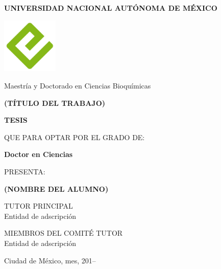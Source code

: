 \documentclass[
  12pt,
  letterpaper,
  DIV=11,
  numbers=noendperiod,
  oneside]{scrreport}
\begin{document}
\begin{titlepage}
    \begin{center}
        \vspace*{0.5cm}
        
        \Large
        \textbf{UNIVERSIDAD NACIONAL AUTÓNOMA DE MÉXICO}
        
        \includegraphics[width=0.2\textwidth]{cover.png}
        
        \vspace{0.5cm}
        
        \vspace{0.5cm}
        \Large
        Maestría y Doctorado en Ciencias Bioquímicas
        
        \vspace{1.5cm}
        
        \LARGE
        \textbf{(TÍTULO DEL TRABAJO)}
        
        \vspace{1.5cm}
        
        \textbf{TESIS}
        
        \vspace{0.5cm}
        
        \Large
        QUE PARA OPTAR POR EL GRADO DE:
        
        \vspace{0.5cm}
        
        \textbf{Doctor en Ciencias}
        
        \vspace{0.5cm}
        
        \Large
        PRESENTA:
        
        \vspace{0.5cm}
        
        \textbf{(NOMBRE DEL ALUMNO)}
        
        \vfill
        
        \Large
        TUTOR PRINCIPAL \\
        Entidad de adscripción
        
        \vspace{0.5cm}
        
        \Large
        MIEMBROS DEL COMITÉ TUTOR \\
        Entidad de adscripción
        
        \vspace{0.7cm}
        
        \Large
        Ciudad de México, mes, 201--
        
    \end{center}
\end{titlepage}
\end{document}
